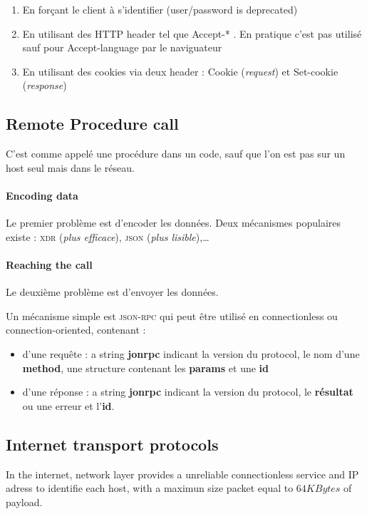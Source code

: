 \begin{enumerate}
    \item En forçant le client à s'identifier (user/password is deprecated)
    \item En utilisant des HTTP header tel que Accept-* . En pratique c'est pas utilisé
        sauf pour Accept-language par le naviguateur
    \item En utilisant des cookies via deux header : Cookie (\textit{request}) et 
        Set-cookie (\textit{response})
\end{enumerate}

\subsection{Remote Procedure call}
C'est comme appelé une procédure dans un code, sauf que l'on est pas sur
un host seul mais dans le réseau.

\paragraph{Encoding data} Le premier problème est d'encoder les données.
Deux mécanismes populaires existe :
\textsc{xdr} (\textit{plus efficace}), \textsc{json} (\textit{plus lisible}),\ldots

\paragraph{Reaching the call}
Le deuxième problème est d'envoyer les données.

Un mécanisme simple est \textsc{json-rpc} qui peut être utilisé en connectionless ou
connection-oriented, contenant :
\begin{itemize} 
    \item d'une requête : a string \textbf{jonrpc} indicant la version du protocol,
        le nom d'une \textbf{method}, une structure contenant les \textbf{params}
        et une \textbf{id}
    \item d'une réponse : a string \textbf{jonrpc} indicant la version du protocol,
        le \textbf{résultat} ou une erreur et l'\textbf{id}.
\end{itemize}


\subsection{Internet transport protocols}
In the internet, network layer provides a unreliable connectionless service and IP
adress to identifie each host, with
a maximun size packet equal to $64KBytes$ of payload.

